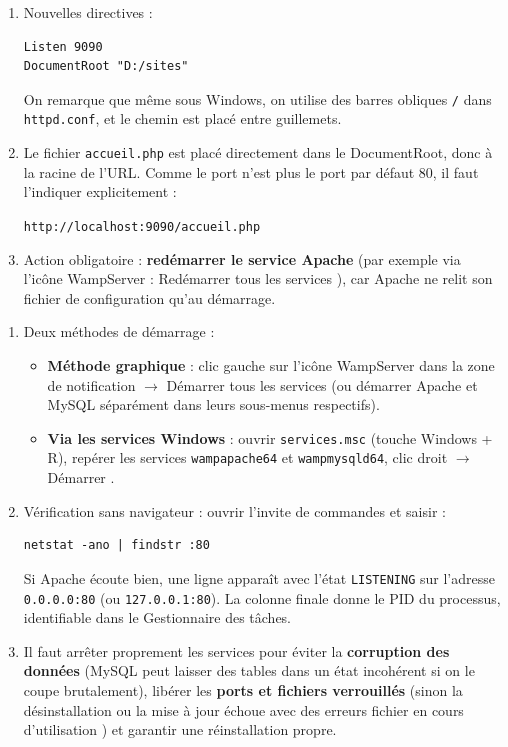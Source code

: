 \documentclass[11pt]{article}
\begin{document}
\begin{corrige}
\begin{enumerate}
\item Nouvelles directives :
\begin{lstlisting}[language=apacheconf]
Listen 9090
DocumentRoot "D:/sites"
\end{lstlisting}
On remarque que même sous Windows, on utilise des barres obliques \texttt{/} dans \texttt{httpd.conf}, et le chemin est placé entre guillemets.
\item Le fichier \texttt{accueil.php} est placé directement dans le DocumentRoot, donc à la racine de l'URL. Comme le port n'est plus le port par défaut 80, il faut l'indiquer explicitement :
\begin{center}
\texttt{http://localhost:9090/accueil.php}
\end{center}
\item Action obligatoire : \textbf{redémarrer le service Apache} (par exemple via l'icône WampServer : \og Redémarrer tous les services \fg{}), car Apache ne relit son fichier de configuration qu'au démarrage.
\end{enumerate}
\end{corrige}

\begin{corrige}
\begin{enumerate}
\item Deux méthodes de démarrage :
\begin{itemize}
\item \textbf{Méthode graphique} : clic gauche sur l'icône WampServer dans la zone de notification $\rightarrow$ \og Démarrer tous les services \fg{} (ou démarrer Apache et MySQL séparément dans leurs sous-menus respectifs).
\item \textbf{Via les services Windows} : ouvrir \texttt{services.msc} (touche Windows + R), repérer les services \texttt{wampapache64} et \texttt{wampmysqld64}, clic droit $\rightarrow$ \og Démarrer \fg{}.
\end{itemize}
\item Vérification sans navigateur : ouvrir l'invite de commandes et saisir :
\begin{lstlisting}
netstat -ano | findstr :80
\end{lstlisting}
Si Apache écoute bien, une ligne apparaît avec l'état \texttt{LISTENING} sur l'adresse \texttt{0.0.0.0:80} (ou \texttt{127.0.0.1:80}). La colonne finale donne le PID du processus, identifiable dans le Gestionnaire des tâches.
\item Il faut arrêter proprement les services pour éviter la \textbf{corruption des données} (MySQL peut laisser des tables dans un état incohérent si on le coupe brutalement), libérer les \textbf{ports et fichiers verrouillés} (sinon la désinstallation ou la mise à jour échoue avec des erreurs \og fichier en cours d'utilisation \fg{}) et garantir une réinstallation propre.
\end{enumerate}
\end{corrige}
\end{document}
